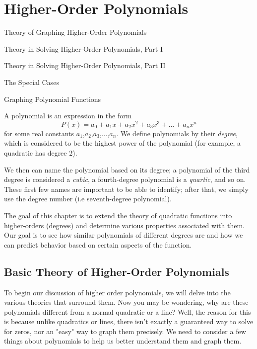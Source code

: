 \documentclass[../book.tex]{subfiles}
\begin{document}
\chapter{Higher-Order Polynomials}
\begin{introduction}[Contents]
\item Theory of Graphing Higher-Order Polynomials
\item Theory in Solving Higher-Order Polynomials, Part I
\item Theory in Solving Higher-Order Polynomials, Part II
\item The Special Cases
\item Graphing Polynomial Functions
\end{introduction}
\noindent A polynomial is an expression in the form $$P(x)=a_0+a_1x+a_2x^2+a_3x^3+\ldots+a_nx^n$$ for some real constants $a_1$,$a_2$,$a_3$,$\ldots$,$a_n$.  We define polynomials by their \textit{degree}, which is considered to be the highest power of the polynomial (for example, a quadratic has degree $2$).

We then can name the polynomial based on its degree; a polynomial of the third degree is considered a \textit{cubic}, a fourth-degree polynomial is a \textit{quartic}, and so on.  These first few names are important to be able to identify; after that, we simply use the degree number (i.e seventh-degree polynomial).

The goal of this chapter is to extend the theory of quadratic functions into higher-orders (degrees) and determine various properties associated with them.  Our goal is to see how similar polynomials of different degrees are and how we can predict behavior based on certain aspects of the function.
\section{Basic Theory of Higher-Order Polynomials}
\noindent To begin our discussion of higher order polynomials, we will delve into the various theories that surround them. Now you may be wondering, why are these polynomials different from a normal quadratic or a line? Well, the reason for this is because unlike quadratics or lines, there isn't exactly a guaranteed way to solve for zeros, nor an "easy" way to graph them precisely.  We need to consider a few things about polynomials to help us better understand them and graph them.
\end{document}
